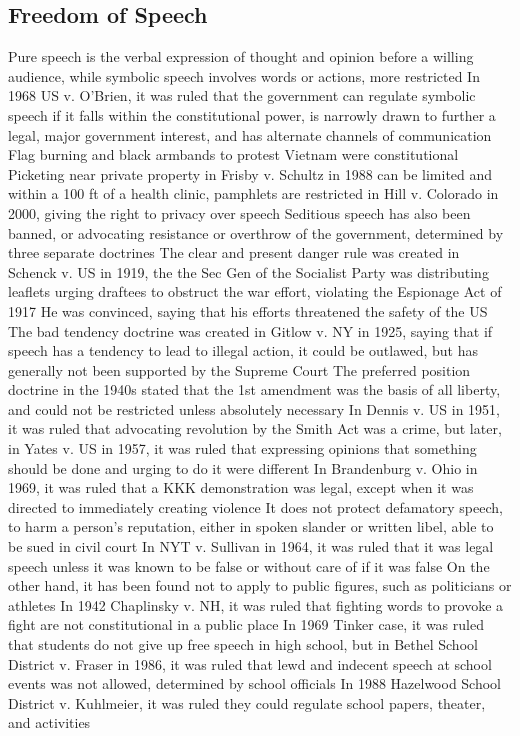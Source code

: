 \documentclass[11 pt, twoside]{article}
\newenvironment{outline*}
{
	\begin{outline}[enumerate]
	}
	{\end{outline}
}
\begin{document}
\subsection{Freedom of Speech}
\begin{outline*}
\1 Pure speech is the verbal expression of thought and opinion before a willing audience, while symbolic speech involves words or actions, more restricted
\1 In 1968 US v. O’Brien, it was ruled that the government can regulate symbolic speech if it falls within the constitutional power, is narrowly drawn to further a legal, major government interest, and has alternate channels of communication
\2 Flag burning and black armbands to protest Vietnam were constitutional
\2 Picketing near private property in Frisby v. Schultz in 1988 can be limited and within a 100 ft of a health clinic, pamphlets are restricted in Hill v. Colorado in 2000, giving the right to privacy over speech
\1 Seditious speech has also been banned, or advocating resistance or overthrow of the government, determined by three separate doctrines
\1 The clear and present danger rule was created in Schenck v. US in 1919, the the Sec Gen of the Socialist Party was distributing leaflets urging draftees to obstruct the war effort, violating the Espionage Act of 1917
\2 He was convinced, saying that his efforts threatened the safety of the US
\1 The bad tendency doctrine was created in Gitlow v. NY in 1925, saying that if speech has a tendency to lead to illegal action, it could be outlawed, but has generally not been supported by the Supreme Court
\1 The preferred position doctrine in the 1940s stated that the 1st amendment was the basis of all liberty, and could not be restricted unless absolutely necessary
\1 In Dennis v. US in 1951, it was ruled that advocating revolution by the Smith Act was a crime, but later, in Yates v. US in 1957, it was ruled that expressing opinions that something should be done and urging to do it were different
\2 In Brandenburg v. Ohio in 1969, it was ruled that a KKK demonstration was legal, except when it was directed to immediately creating violence
\1 It does not protect defamatory speech, to harm a person’s reputation, either in spoken slander or written libel, able to be sued in civil court
\2 In NYT v. Sullivan in 1964, it was ruled that it was legal speech unless it was known to be false or without care of if it was false
\2 On the other hand, it has been found not to apply to public figures, such as politicians or athletes
\1 In 1942 Chaplinsky v. NH, it was ruled that fighting words to provoke a fight are not constitutional in a public place
\1  In 1969 Tinker case, it was ruled that students do not give up free speech in high school, but in Bethel School District v. Fraser in 1986, it was ruled that lewd and indecent speech at school events was not allowed, determined by school officials
\2 In 1988 Hazelwood School District v. Kuhlmeier, it was ruled they could regulate school papers, theater, and activities
\end{outline*}
\end{document}
